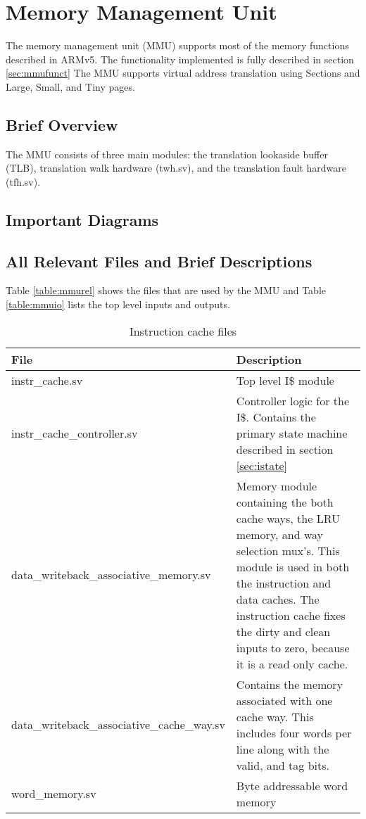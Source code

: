 \section{Memory Management Unit}
The memory management unit (MMU) supports most of the memory functions described in ARMv5.
The functionality implemented is fully described in section \ref{sec:mmufunct}
The MMU supports virtual address translation using Sections and Large, Small, and Tiny pages.

\subsection{Brief Overview}

The MMU consists of three main modules: the translation lookaside buffer (TLB), translation walk hardware (twh.sv), and the translation fault hardware (tfh.sv). 

\subsection{Important Diagrams}


\subsection{All Relevant Files and Brief Descriptions}

Table \ref{table:mmurel} shows the files that are used by the MMU and Table \ref{table:mmuio} lists the top level inputs and outputs.

	\begin{table}
	\label{table:irel}
	\begin{tabular}{|l|p{70mm}|}
	\hline File  & Description \\ 
	\hline  instr\_cache.sv & Top level I\$ module \\ 
	\hline  instr\_cache\_controller.sv & Controller logic for the I\$.
	Contains the primary state machine described in section \ref{sec:istate} \\ 
	\hline  data\_writeback\_associative\_memory.sv & 
	Memory module containing the both cache ways, the LRU memory, and way selection mux's.
	This module is used in both the instruction and data caches.
	The instruction cache fixes the dirty and clean inputs to zero, because it is a read only cache.\\ 
	\hline  data\_writeback\_associative\_cache\_way.sv & 
	Contains the memory associated with one cache way. This includes four words per line along with the valid, and tag bits. \\ 
	\hline  word\_memory.sv & Byte addressable word memory  \\
	\hline
	\end{tabular} 
	\caption{Instruction cache files}
	\end{table}

